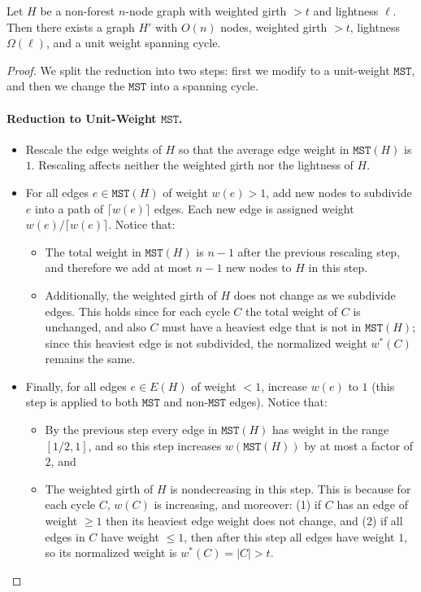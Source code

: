 \documentclass{article}\usepackage[a4paper,margin=20mm]{geometry}
\newcommand{\mst}{\texttt{MST}}
\begin{document}
\begin{lemma}
Let $H$ be a non-forest $n$-node graph with weighted girth $>t$ and lightness $\ell$.
Then there exists a graph $H'$ with $O(n)$ nodes, weighted girth $>t$, lightness $\Omega(\ell)$, and a unit weight spanning cycle.
\end{lemma}
\begin{proof}
We split the reduction into two steps: first we modify to a unit-weight $\mst$, and then we change the $\mst$ into a spanning cycle.

\paragraph{Reduction to Unit-Weight $\mst$.}

\begin{itemize}
\item Rescale the edge weights of $H$ so that the average edge weight in $\mst(H)$ is $1$.
Rescaling affects neither the weighted girth nor the lightness of $H$.

\item For all edges $e \in \mst(H)$ of weight $w(e) > 1$, add new nodes to subdivide $e$ into a path of $\lceil w(e) \rceil$ edges.
Each new edge is assigned weight $w(e) / \lceil w(e) \rceil$.
Notice that:
\begin{itemize}
\item The total weight in $\mst(H)$ is $n-1$ after the previous rescaling step, and therefore we add at most $n-1$ new nodes to $H$ in this step.

\item Additionally, the weighted girth of $H$ does not change as we subdivide edges.
This holds since for each cycle $C$ the total weight of $C$ is unchanged, and also $C$ must have a heaviest edge that is not in $\mst(H)$; since this heaviest edge is not subdivided, the normalized weight $w^*(C)$ remains the same.
\end{itemize}

\item Finally, for all edges $e \in E(H)$ of weight $< 1$, increase $w(e)$ to $1$ (this step is applied to both $\mst$ and non-$\mst$ edges).
Notice that:
\begin{itemize}
\item By the previous step every edge in $\mst(H)$ has weight in the range $[1/2, 1]$, and so this step increases $w(\mst(H))$ by at most a factor of $2$, and

\item The weighted girth of $H$ is nondecreasing in this step.
This is because for each cycle $C$, $w(C)$ is increasing, and moreover: (1) if $C$ has an edge of weight $\ge 1$ then its heaviest edge weight does not change, and (2) if all edges in $C$ have weight $\le 1$, then after this step all edges have weight $1$, so its normalized weight is $w^*(C) = |C| > t$. 
\end{itemize}
\end{itemize}



\end{proof}
\end{document}
